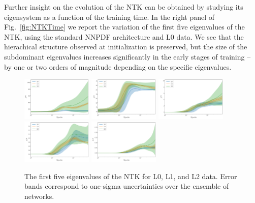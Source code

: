 Further insight on the evolution of the NTK can be obtained by studying its
eigensystem as a function of the training time. In the right panel of
Fig.~\ref{fig:NTKTime} we report the variation of the first five eigenvalues of
the NTK, using the standard NNPDF architecture and L0 data. We see that the
hierachical structure observed at initialization is preserved, but the size of
the subdominant eigenvalues increases significantly in the early stages of
training -- by one or two orders of magnitude depending on the specific
eigenvalues. 

\begin{figure}[t]
  \centering
  \includegraphics[width=0.30\textwidth]{figs/section_3/ntk_eigvals_L0_L1_L2_n_1.pdf}
  \includegraphics[width=0.30\textwidth]{figs/section_3/ntk_eigvals_L0_L1_L2_n_2.pdf}
  \includegraphics[width=0.30\textwidth]{figs/section_3/ntk_eigvals_L0_L1_L2_n_3.pdf}
  \includegraphics[width=0.30\textwidth]{figs/section_3/ntk_eigvals_L0_L1_L2_n_4.pdf}
  \includegraphics[width=0.30\textwidth]{figs/section_3/ntk_eigvals_L0_L1_L2_n_5.pdf}
  \caption{The first five eigenvalues of the NTK for L0, L1, and L2 data. Error
  bands correspond to one-sigma uncertainties over the ensemble of networks.}
  \label{fig:EigvalsComparison}
\end{figure}

